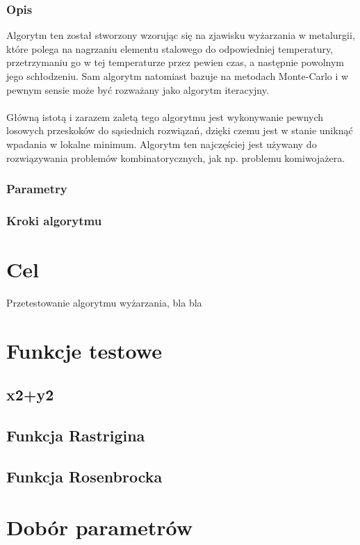 \documentclass{report}
\newcommand{\newLine}{~\\}
\newcommand{\si}{ś}
\begin{document}
			\subsection{Opis}
	Algorytm ten został stworzony wzorując się na zjawisku wyżarzania w metalurgii, które polega na nagrzaniu elementu stalowego do odpowiedniej temperatury, przetrzymaniu go w tej temperaturze przez pewien czas, a następnie powolnym jego schłodzeniu. Sam algorytm natomiast bazuje na metodach Monte-Carlo i w pewnym sensie może być rozważany jako algorytm iteracyjny.\\ \newLine
Główną istotą i zarazem zaletą tego algorytmu jest wykonywanie pewnych losowych przeskoków do sąsiednich rozwiązań, dzięki czemu jest w stanie uniknąć wpadania w lokalne minimum. Algorytm ten najczę\si ciej jest używany do rozwiązywania problemów kombinatorycznych, jak np. problemu komiwojażera.
			\subsection{Parametry}

			\subsection{Kroki algorytmu}


	\chapter{Cel}
	Przetestowanie algorytmu wyżarzania, bla bla
	\chapter{Funkcje testowe}
		\section{x\^2+y\^2}
		\section{Funkcja Rastrigina}
		\section{Funkcja Rosenbrocka}
	\chapter{Dobór parametrów}
\end{document}
